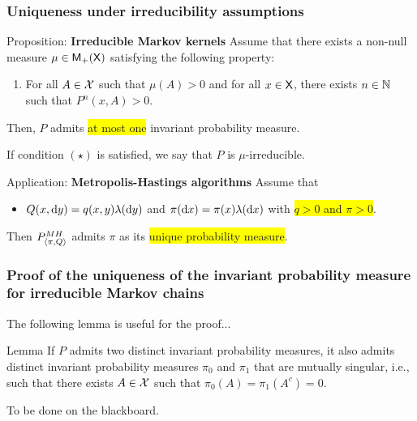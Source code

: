 \documentclass[usenames,dvipsnames]{beamer}
\newcommand\mycoltwo[1]{{\color{blue}#1}}
\newcommand\mycolthree[1]{{\color{Emerald}#1}}
\newcommand\colbox[1]{\colorbox{Yellow}{#1}}
\begin{document}
\begin{frame}
  \frametitle{Uniqueness under irreducibility assumptions}
  \begin{block}{Proposition: \textbf{Irreducible Markov kernels}}
    Assume that there exists a non-null measure \textup{$\mu\in\mathsf{M}_{+}(\mathsf{X})$}
satisfying the following property:
\begin{enumerate}[$(\star)$]
\item \alert{For all $A\in\mathcal{X}$ such that $\mu(A)>0$ and for all $x\in\mathsf{X}$,
there exists $n\in\mathbb{N}$ such that $P^{n}(x,A)>0$}.
\end{enumerate}
Then, $P$ admits \colbox{at most one} invariant probability measure.
  \end{block}
  \pause 
  If condition $(\star)$ is satisfied, we say that $P$ is \mycoltwo{$\mu$-irreducible}. \pause 
  \begin{block}{Application: \textbf{Metropolis-Hastings algorithms}}
    Assume that 
    \begin{itemize}
      \item \alert{$Q(x,\mathrm{d} y)=q(x,y) \lambda(\mathrm{d} y)$ 
      and $\pi(\mathrm{d} x)=\pi(x)\lambda(\mathrm{d} x)$ with \colbox{$q>0$ and $\pi>0$}.  } 
    \end{itemize}
  
    Then $P_{\langle\pi,Q\rangle}^{MH}$ admits $\pi$ as its \colbox{unique probability
    measure}.         
  \end{block}
\end{frame}
\begin{frame}
  \frametitle{Proof of the uniqueness of the invariant probability measure for irreducible Markov chains}
  The following lemma is useful for the proof... 
  \begin{block}{Lemma}
    If $P$ admits two distinct invariant
    probability measures, it also admits distinct invariant probability
    measures $\pi_{0}$ and $\pi_{1}$ that are mutually singular, i.e.,
    such that there exists $A\in\mathcal{X}$ such that $\pi_{0}(A)=\pi_{1}(A^{c})=0$.
  \end{block}
  \pause 
  \mycolthree{To be done on the blackboard.} 
\end{frame}
\end{document}
